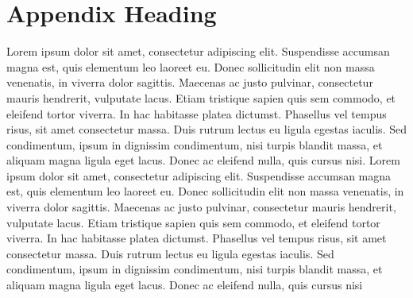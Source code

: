 \documentclass{winnower}
\begin{document}
\section{Appendix Heading}
Lorem ipsum dolor sit amet, consectetur adipiscing elit. Suspendisse accumsan magna est, quis elementum leo laoreet eu. Donec sollicitudin elit non massa venenatis, in viverra dolor sagittis. Maecenas ac justo pulvinar, consectetur mauris hendrerit, vulputate lacus. Etiam tristique sapien quis sem commodo, et eleifend tortor viverra. In hac habitasse platea dictumst. Phasellus vel tempus risus, sit amet consectetur massa. Duis rutrum lectus eu ligula egestas iaculis. Sed condimentum, ipsum in dignissim condimentum, nisi turpis blandit massa, et aliquam magna ligula eget lacus. Donec ac eleifend nulla, quis cursus nisi. Lorem ipsum dolor sit amet, consectetur adipiscing elit. Suspendisse accumsan magna est, quis elementum leo laoreet eu. Donec sollicitudin elit non massa venenatis, in viverra dolor sagittis. Maecenas ac justo pulvinar, consectetur mauris hendrerit, vulputate lacus. Etiam tristique sapien quis sem commodo, et eleifend tortor viverra. In hac habitasse platea dictumst. Phasellus vel tempus risus, sit amet consectetur massa. Duis rutrum lectus eu ligula egestas iaculis. Sed condimentum, ipsum in dignissim condimentum, nisi turpis blandit massa, et aliquam magna ligula eget lacus. Donec ac eleifend nulla, quis cursus nisi
\end{document}
